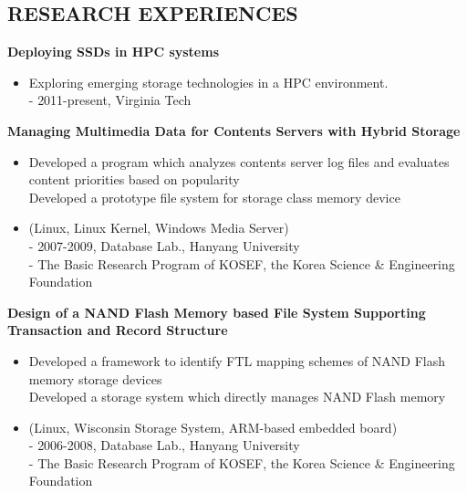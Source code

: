 \documentclass{res}
\begin{document}
\begin{resume}
 
\section{RESEARCH EXPERIENCES} 
\vspace{0.1in}
  {\bf Deploying SSDs in HPC systems}
    \begin{itemize}
    \item[] Exploring emerging storage technologies in a HPC environment.
    \vspace{0.05in}\\
    - {\small 2011-present, Virginia Tech}
    \end{itemize}

  {\bf Managing Multimedia Data for Contents Servers with Hybrid Storage}
    \begin{itemize} %
      \item[] 
	Developed a program which analyzes contents server log files and
	evaluates content priorities based on popularity \\
	Developed a prototype file system for storage class memory device
        \item[] (Linux, Linux Kernel, Windows Media Server) 
	\vspace{0.05in}\\
        - {\small 2007-2009, Database Lab., Hanyang University}\\
	- {\small The Basic Research Program of KOSEF, the Korea Science \& Engineering
	Foundation}
      \end{itemize}

  {\bf Design of a NAND Flash Memory based File System Supporting Transaction and
       Record Structure} 
        \begin{itemize}
        \item[]
	Developed a framework to identify FTL mapping schemes of NAND Flash
	memory storage devices \\
	Developed a storage system which directly manages NAND Flash memory
        \item[] (Linux, Wisconsin Storage System, ARM-based embedded board)
	\vspace{0.05in}\\
	- {\small 2006-2008, Database Lab., Hanyang University}\\
	- {\small The Basic Research Program of KOSEF, the Korea Science \& Engineering
	Foundation}
       \end{itemize}


\end{resume}
\end{document}
